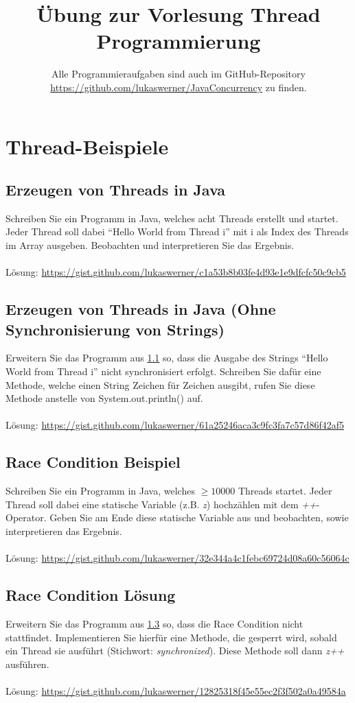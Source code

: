 \documentclass[a4paper]{scrartcl}
\title{Übung zur Vorlesung Thread Programmierung}
\subtitle{Alle Programmieraufgaben sind auch im GitHub-Repository \url{https://github.com/lukaswerner/JavaConcurrency} zu finden.}
\author{}
\date{}
\begin{document}
	
\maketitle

\section{Thread-Beispiele}

\subsection{Erzeugen von Threads in Java}\label{javathreads}
Schreiben Sie ein Programm in Java, welches acht Threads erstellt und startet. Jeder Thread soll dabei "`Hello World from Thread i"' mit i als Index des Threads im Array ausgeben. Beobachten und interpretieren Sie das Ergebnis.\\
\\
Lösung: \url{https://gist.github.com/lukaswerner/c1a53b8b03fe4d93e1e9dfcfc50c9cb5}

\subsection{Erzeugen von Threads in Java (Ohne Synchronisierung von Strings)}
Erweitern Sie das Programm aus \ref{javathreads} so, dass die Ausgabe des Strings "`Hello World from Thread i"' nicht synchronisiert erfolgt. Schreiben Sie dafür eine Methode, welche einen String Zeichen für Zeichen ausgibt, rufen Sie diese Methode anstelle von System.out.println() auf.\\
\\
Lösung: \url{https://gist.github.com/lukaswerner/61a25246aca3c9fc3fa7c57d86f42af5}

\subsection{Race Condition Beispiel}\label{racecondition}
Schreiben Sie ein Programm in Java, welches $ \geq 10000 $ Threads startet. Jeder Thread soll dabei eine statische Variable (z.B. \emph{z}) hochzählen mit dem \emph{++}-Operator. Geben Sie am Ende diese statische Variable aus und beobachten, sowie interpretieren das Ergebnis.\\
\\
Lösung: \url{https://gist.github.com/lukaswerner/32e344a4c1febc69724d08a60c56064c}

\subsection{Race Condition Lösung}
Erweitern Sie das Programm aus \ref{racecondition} so, dass die Race Condition nicht stattfindet. Implementieren Sie hierfür eine Methode, die gesperrt wird, sobald ein Thread sie ausführt (Stichwort: \emph{synchronized}). Diese Methode soll dann \emph{z++} ausführen.\\
\\
Lösung: \url{https://gist.github.com/lukaswerner/12825318f45e55ec2f3f502a0a49584a}
\end{document}
